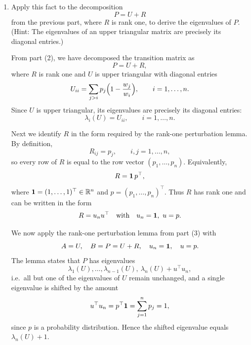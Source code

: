 \documentclass[answers,12pt,addpoints]{exam}
\begin{document}
\begin{enumerate}
\begin{solution}
On the other hand, if $\tilde u_j$ is an eigenvector of $B$ with
eigenvalue $\lambda_j$, then
\[
B \tilde u_j = \lambda_j \tilde u_j
= \lambda_j (u_j + c_j u_n)
= \lambda_j u_j + c_j \lambda_j u_n.
\]
Comparing coefficients of $u_j$ and $u_n$ gives:
\[
c_j \lambda_n + u^\top u_j + c_j u^\top u_n = c_j \lambda_j.
\]
Rearranging,
\[
u^\top u_j
= c_j\bigl(\lambda_j - \lambda_n - u^\top u_n\bigr),
\]
and hence
\[
c_j = \frac{u^\top u_j}{\lambda_j - \lambda_n - u^\top u_n}.
\]
By assumption, the denominator is nonzero for all $j=1,\dots,n-1$, so
each $c_j$ is well-defined. Therefore, for every $j\neq n$, the vector
$\tilde u_j = u_j + c_j u_n$ is an eigenvector of $B$ with eigenvalue
$\lambda_j$.

\medskip
Combining the two cases, $B$ has eigenvalues
$\lambda_1,\dots,\lambda_{n-1},\lambda_n + u^\top u_n$ with
corresponding eigenvectors as claimed.
\end{solution}
\item Apply this fact to the decomposition
\[
P = U + R
\]
from the previous part, where $R$ is rank one, to derive the eigenvalues of $P$. (Hint: The eigenvalues of an upper triangular matrix are precisely its diagonal entries.)
\begin{solution}
From part (2), we have decomposed the transition matrix as
\[
P = U + R,
\]
where $R$ is rank one and $U$ is upper triangular with diagonal entries
\[
U_{ii} = \sum_{j>i} p_j\Bigl(1 - \frac{w_j}{w_i}\Bigr), \qquad i = 1,\dots,n.
\]
Since $U$ is upper triangular, its eigenvalues are precisely its diagonal
entries:
\[
\lambda_i(U) = U_{ii},\qquad i = 1,\dots,n.
\]

Next we identify $R$ in the form required by the rank-one perturbation lemma.
By definition,
\[
R_{ij} = p_j,\qquad i,j = 1,\dots,n,
\]
so every row of $R$ is equal to the row vector $(p_1,\dots,p_n)$.
Equivalently,
\[
R = {\bf 1}\, p^{\top},
\]
where ${\bf 1} = (1,\dots,1)^{\top}\in\mathbb{R}^n$ and
$p = (p_1,\dots,p_n)^{\top}$. Thus $R$ has rank one and can be written
in the form
\[
R = u_n u^{\top} \quad\text{with}\quad u_n = {\bf 1},\ u = p.
\]

We now apply the rank-one perturbation lemma from part (3) with
\[
A = U,\quad B = P = U + R,\quad u_n = {\bf 1},\quad u = p.
\]
The lemma states that $P$ has eigenvalues
\[
\lambda_1(U),\dots,\lambda_{n-1}(U),\ \lambda_n(U) + u^{\top}u_n,
\]
i.e.\ all but one of the eigenvalues of $U$ remain unchanged, and a single
eigenvalue is shifted by the amount
\[
u^{\top}u_n = p^{\top}{\bf 1} = \sum_{j=1}^n p_j = 1,
\]
since $p$ is a probability distribution. Hence the shifted eigenvalue equals
$\lambda_n(U) + 1$.


\end{solution}
\end{enumerate}
\end{document}
